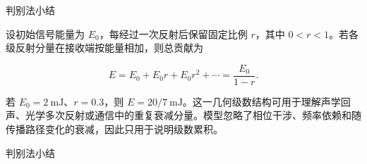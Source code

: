 \documentclass[aspectratio=169,10pt,fontset=fandol]{ctexbeamer}
\begin{document}
\begin{frame}[t,fragile]{判别法小结}
\normalsize
{\normalsize
\begin{application}[工程：多次反射与信号衰减]

设初始信号能量为 $E_0$，每经过一次反射后保留固定比例 $r$，其中 $0<r<1$。若各级反射分量在接收端按能量相加，则总贡献为

\[

E=E_0+E_0r+E_0r^2+\cdots

=\frac{E_0}{1-r}.

\]

若 $E_0=2\ \mathrm{mJ}$、$r=0.3$，则 $E=20/7\ \mathrm{mJ}$。这一几何级数结构可用于理解声学回声、光学多次反射或通信中的重复衰减分量。模型忽略了相位干涉、频率依赖和随传播路径变化的衰减，因此只用于说明级数累积。

\end{application}
}
\end{frame}
\begin{frame}[t,fragile]{判别法小结}
\normalsize
{\normalsize




\iffalse






}
\end{frame}
\end{document}
